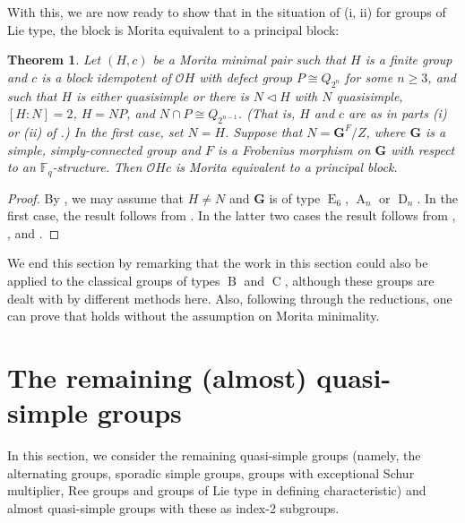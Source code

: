 \documentclass{amsart}
\theoremstyle{plain}\newtheorem{Theorem}{Theorem}[section]
\theoremstyle{plain}\newtheorem{Conjecture}[Theorem]{Conjecture}
\theoremstyle{plain}\newtheorem{Corollary}[Theorem]{Corollary}
\theoremstyle{plain}\newtheorem{Lemma}[Theorem]{Lemma}
\theoremstyle{plain}\newtheorem{Proposition}[Theorem]{Proposition}
\theoremstyle{definition}\newtheorem{Definition}[Theorem]{Definition}
\theoremstyle{definition}\newtheorem{Example}[Theorem]{Example}
\theoremstyle{definition}\newtheorem{Examples}[Theorem]{Examples}
\theoremstyle{definition}\newtheorem{Exercise}[Theorem]{Exercise}
\theoremstyle{definition}\newtheorem{Notation}[Theorem]{Notation}
\theoremstyle{definition}\newtheorem{Remark}[Theorem]{Remark}
\theoremstyle{definition}\newtheorem{Remarks}[Theorem]{Remarks}
\def\CO{{\mathcal{O}}}    \def\OPE{{\mathcal{O}(P\rtimes E)}}
\newcommand{\bG}{{\mathbf{G}}}
\newcommand{\type}{\operatorname}
\numberwithin{equation}{section}
\begin{document}
With this, we are now ready to show that in the situation of (i, ii) for groups of Lie type, the block is Morita equivalent to a principal block: 
\begin{Theorem}  
Let $(H,c)$ be a Morita minimal pair such that $H$ is a finite group and $c$ is a block idempotent of $\CO  H$ with defect group $P \cong Q_{2^n}$ for some $n \geq 3$, and such that $H$ is either quasisimple or there is $N\lhd H$ with $N$ quasisimple, $[H:N]=2$, $H=NP$, and $N\cap P\cong Q_{2^{n-1}}$. (That is, $H$ and  $c$ are as in parts (i) or (ii)  of 
.) In the first case,  set  $ N=H$.  %
Suppose that $N= \bG^F/Z$, where  $\bG$  is a simple, simply-connected  group and $F$   is a  Frobenius morphism on $\bG$ with respect to an ${\mathbb F}_q$-structure. Then  $\CO Hc $ is Morita equivalent to a principal block.
\end{Theorem}

\begin{proof}  By , we may assume that  $H \ne N $ and  $\bG$ is  of type $\type{E}_6$, $\type{A}_n$  or $\type{D}_n$. In the first case, the result follows  from . In the latter two cases the result  follows  from , , and .
\end{proof}

We end this section by remarking that the work in this section could also be applied to the classical groups of types $\type{B}$ and $\type{C}$, although these groups are dealt with by different methods here. Also,  following through the reductions, one can prove that    holds without the assumption on Morita minimality.

\section{The remaining (almost) quasi-simple groups}\label{sec:altspor}

In this section, we consider the remaining quasi-simple groups (namely, the alternating groups, sporadic simple groups, groups with exceptional Schur multiplier, Ree groups and groups of Lie type in defining characteristic) and almost quasi-simple groups with these as index-2 subgroups. 
\end{document}
